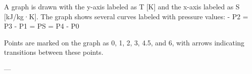 A graph is drawn with the y-axis labeled as T [K] and the x-axis labeled as S [kJ/kg·K]. The graph shows several curves labeled with pressure values:  
- P2 = P3  
- P1 = PS = P4  
- P0  

Points are marked on the graph as 0, 1, 2, 3, 4.5, and 6, with arrows indicating transitions between these points.

---